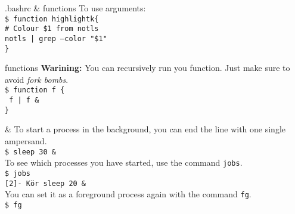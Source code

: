 \documentclass{beamer}
\let\tt\texttt
\let\bf\textbf
\let\it\itshape
\begin{document}
\begin{frame}{.bashrc \& functions}
        To use arguments:                       \\
        \tt{\$ function highlightk\{ }        \\
        \quad \tt{\# Colour \$1 from notls}          \\
        \quad \tt{notls | grep --color "\$1" }  \\
        \tt{\} }                                \\
\end{frame}

\begin{frame}{functions}
        \bf{Warining:} You can recursively run you function. Just make sure to avoid {\it fork bombs}.  \\
        \tt{\$ function f \{ }        \\
        \quad \tt{ f | f {\&}}  \\
        \tt{\} }                                \\
\end{frame}

\begin{frame}{\&}
        To start a process in the background, you can end the line with one single ampersand.   \\
        \tt{\$ sleep 30 {\&} }    \\
        To see which processes you have started, use the command \tt{jobs}. \\
        \tt{\$ jobs }  \\
        \tt{[2]- Kör sleep 20 {\&}}  \\
        You can set it as a foreground process again with the command \tt{fg}.  \\
        \tt{\$ fg}  \\
        \tt{} \\
\end{frame}
\end{document}
